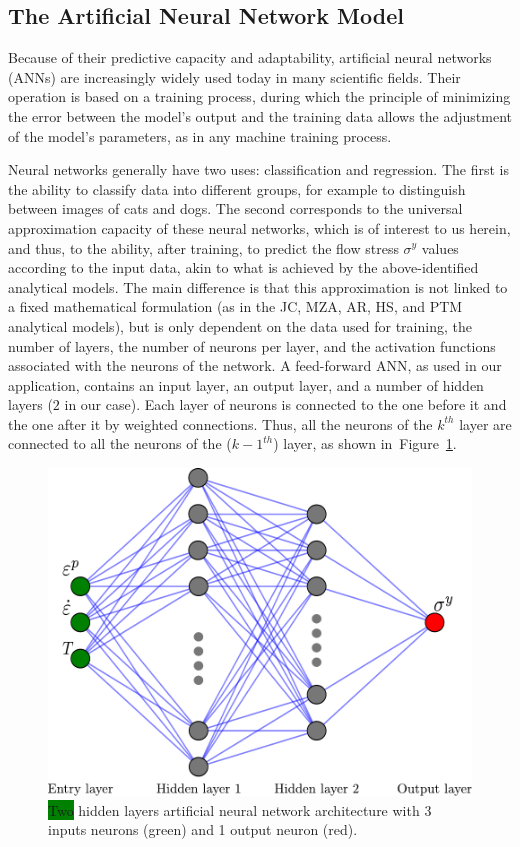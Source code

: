 \documentclass[metals,article,accept,pdftex,moreauthors]{Definitions/mdpi}
\newcommand{\hlok}[1]{\colorbox{green}{#1}}
\begin{document}
\subsection{The Artificial Neural Network Model\label{sec:ANNmodel}}

Because of their predictive capacity and adaptability, artificial neural networks (ANNs) are increasingly widely used today in many scientific fields.
Their operation is based on a training process, during which the principle of minimizing the error between the model's output and the training data allows the adjustment of the model's parameters, as in any machine training process.

Neural networks generally have two uses: classification and regression.
The first is the ability to classify data into different groups, for example to distinguish between images of cats and dogs.
The second corresponds to the universal approximation capacity of these neural networks, which is of interest to us herein, and thus, to the ability, after training, to predict the flow stress $\sigma^y$ values according to the input data, akin to what is achieved by the above-identified analytical models.
The main difference is that this approximation is not linked to a fixed mathematical formulation (as in the JC, MZA, AR, HS, and PTM analytical models), but is only dependent on the data used for training, the number of layers, the number of neurons per layer, and the activation functions associated with the neurons of the network.
A feed-forward ANN, as used in our application, contains an input layer, an output layer, and a number of hidden layers ($2$ in our case).
Each layer of neurons is connected to the one before it and the one after it by weighted connections.
Thus, all the neurons of the $k^{th}$ layer are connected to all the neurons of the ($k-1^{th}$) layer, as shown in~Figure~\ref{fig:ANN-2HL}.
\begin{figure}[H]

\includegraphics[width=0.7\columnwidth]
{Figures/ANN-scheme-2HL}
\caption{\hlok{Two} %
 hidden layers artificial neural network architecture with 3 inputs neurons (green) and 1 output neuron (red).}
\label{fig:ANN-2HL}
\end{figure}
\end{document}
